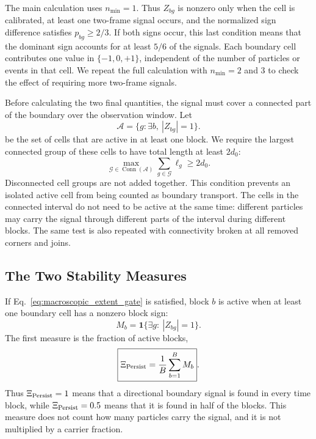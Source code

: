 \documentclass[11pt]{article}
\numberwithin{equation}{section}
\begin{document}
The main calculation uses $n_{\min}=1$.  Thus $Z_{bg}$ is nonzero only when the
cell is calibrated, at least one two-frame signal occurs, and the normalized
sign difference satisfies $p_{bg}\ge2/3$.  If both signs occur, this last
condition means that the dominant sign accounts for at least $5/6$ of the
signals.  Each boundary cell contributes one value in $\{-1,0,+1\}$,
independent of the number of particles or events in that cell.  We repeat the
full calculation with $n_{\min}=2$ and $3$ to check the effect of requiring
more two-frame signals.

Before calculating the two final quantities, the signal must cover a connected
part of the boundary over the observation window.  Let
\begin{equation}
  \mathcal A=\{g:\exists b,\ |Z_{bg}|=1\}.
  \label{eq:active_gate_union}
\end{equation}
be the set of cells that are active in at least one block.  We require the
largest connected group of these cells to have total length at least $2d_0$:
\begin{equation}
  \max_{\mathcal G\in\operatorname{Conn}(\mathcal A)}
  \sum_{g\in\mathcal G}\ell_g\ge2d_0.
  \label{eq:macroscopic_extent_gate}
\end{equation}
Disconnected cell groups are not added together.  This condition prevents an
isolated active cell from being counted as boundary transport.  The cells in
the connected interval do not need to be active at the same time: different
particles may carry the signal through different parts of the interval during
different blocks.  The same test is also repeated with connectivity broken at
all removed corners and joins.

\subsection{The Two Stability Measures}

If Eq.~\eqref{eq:macroscopic_extent_gate} is satisfied, block $b$ is active
when at least one boundary cell has a nonzero block sign:
\begin{equation}
  M_b=\mathbf 1\{\exists g:\ |Z_{bg}|=1\}.
  \label{eq:active_boundary_block}
\end{equation}
The first measure is the fraction of active blocks,
\begin{equation}
  \boxed{
  \Xi_{\rm Persist}=\frac{1}{B}\sum_{b=1}^{B}M_b
  }.
  \label{eq:xi_persist}
\end{equation}
Thus $\Xi_{\rm Persist}=1$ means that a directional boundary signal is found in
every time block, while $\Xi_{\rm Persist}=0.5$ means that it is found in half
of the blocks.  This measure does not count how many particles carry the
signal, and it is not multiplied by a carrier fraction.
\end{document}
